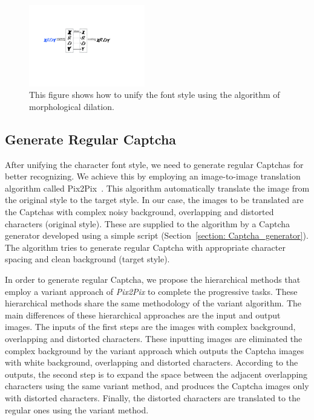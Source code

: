 \begin{figure}
  \centering
  \includegraphics[width=0.45\textwidth]{fig/captcha_preprocessing/preprocessing.pdf}
  \caption{This figure shows how to unify the font style using the algorithm of morphological dilation.}
  \label{fig: preprocessing}
\end{figure}

\subsection{Generate Regular Captcha}
After unifying the character font style, we need to generate regular Captchas for better recognizing. We achieve this by employing an image-to-image translation algorithm called Pix2Pix~\cite{Pix2PixCode}. This algorithm automatically translate the image from the original style to the target style. In our case, the images to be translated are the Captchas with complex noisy background, overlapping and distorted characters (original style). These are supplied to the algorithm by a Captcha generator developed using a simple script (Section~\ref{section: Captcha_generator}). The algorithm tries to generate regular Captcha with appropriate character spacing and clean background (target style).

In order to generate regular Captcha, we propose the hierarchical methods that employ a variant approach of \emph{Pix2Pix} to complete the progressive tasks.
These hierarchical methods share the same methodology of the variant algorithm.
The main differences of these hierarchical approaches are the input and output images. The inputs of the first steps are the images with complex background, overlapping and distorted characters.
These inputting images are eliminated the complex background by the variant approach which outputs the Captcha images with white background, overlapping and distorted characters.
According to the outputs, the second step is to expand the space between the adjacent overlapping characters using the same variant method, and produces the Captcha images only with distorted characters.
Finally, the distorted characters are translated to the regular ones using the variant method.

